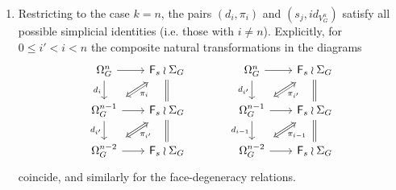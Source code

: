 \documentclass[a4paper,10pt]{article}%
\begin{document}
\begin{proposition}
\begin{enumerate}[label=(\alph*)]
\item Restricting to the case $k=n$, the pairs $(d_i,\pi_i)$ and
$(s_j,id_{V_{G}^{n}})$ satisfy all possible simplicial identities (i.e. those with $i \neq n$).
Explicitly, for $0 \leq i' < i < n$
the composite natural transformations
in the diagrams
\begin{equation}\label{SIMPPI EQ}
\begin{tikzcd}[row sep=1.7em,column sep = 2em]
	\Omega_{G}^{n} \ar{r}{} \ar{d}[swap]{d_{i}} &
	|[alias=F1]|
	\Fin_s \wr \Sigma_G \ar[equal]{d}
&&
	\Omega_{G}^{n} \ar{r}{} \ar{d}[swap]{d_{i'}} &
	|[alias=F12]|
	\Fin_s \wr \Sigma_G \ar[equal]{d}
\\
	|[alias=G2]|
	\Omega_{G}^{n-1} \ar{r}[swap]{}  \ar{d}[swap]{d_{i'}} &
	|[alias=F2]|
	\Fin_s \wr \Sigma_G \ar[equal]{d}
&&
	|[alias=G22]|
	\Omega_{G}^{n-1} \ar{r}[swap]{}  \ar{d}[swap]{d_{i-1}} &
	|[alias=F22]|
	\Fin_s \wr \Sigma_G \ar[equal]{d}
\\
	|[alias=G3]|
	\Omega_{G}^{n-2} \ar{r}{} &
	\Fin_s \wr \Sigma_G
&&
	|[alias=G32]|
	\Omega_{G}^{n-2} \ar{r}{} &
	\Fin_s \wr \Sigma_G
\arrow[Leftrightarrow, from=F1, to=G2,shorten >=0.15cm,shorten <=0.15cm,"\pi_{i}"]
\arrow[Leftrightarrow, from=F2, to=G3,shorten >=0.15cm,shorten <=0.15cm,"\pi_{i'}"]
\arrow[Leftrightarrow, from=F12, to=G22,shorten >=0.15cm,shorten <=0.15cm,"\pi_{i'}"]
\arrow[Leftrightarrow, from=F22, to=G32,shorten >=0.15cm,shorten <=0.15cm,"\pi_{i-1}"]
\end{tikzcd}
\end{equation}
coincide, and similarly for the face-degeneracy relations.
\end{enumerate}
\end{proposition}
\end{document}
